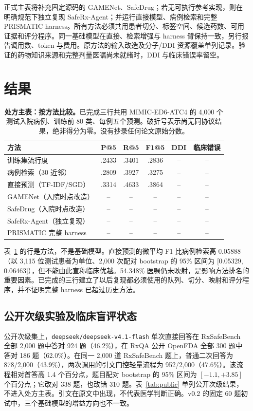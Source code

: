 \documentclass[UTF8,11pt,a4paper]{ctexart}
\begin{document}
正式主表将补充固定源码的 GAMENet、SafeDrug；若无可执行参考实现，则在明确规范下独立复现 SafeRx-Agent；并运行直接模型、病例检索和完整 PRISMATIC harness。所有方法必须共用患者切分、标签空间、候选药数、可用证据和评分程序。同一基础模型在直接、检索增强与 harness 臂保持一致，另行报告调用数、token 与费用。原方法的输入改造及分子/DDI 资源覆盖单列记录。验证的药物知识来源和完整剂量医嘱尚未就绪时，DDI 与临床错误率留空。

\section{结果}
\begin{table}[t]
\centering\small
\caption{\textbf{处方主表：按方法比较。}已完成三行共用 MIMIC-ED6-ATC4 的 4,000 个测试入院病例、训练前 80 类、每例五个预测。破折号表示尚无同协议结果，绝非得分为零。没有抄录任何论文原始分数。}
\label{tab:main}
\begin{tabular}{@{}p{4.1cm}ccccc@{}}
\toprule
方法 & P@5 & R@5 & F1@5 & DDI & 临床错误 \\
\midrule
训练集流行度 & .2433 & .3401 & .2836 & -- & -- \\
病例检索（30 近邻） & .2809 & .3927 & .3275 & -- & -- \\
直接预测（TF-IDF/SGD） & .3314 & .4633 & .3864 & -- & -- \\
GAMENet（入院时点改造） & -- & -- & -- & -- & -- \\
SafeDrug（入院时点改造） & -- & -- & -- & -- & -- \\
SafeRx-Agent（独立复现） & -- & -- & -- & -- & -- \\
PRISMATIC 完整 harness & -- & -- & -- & -- & -- \\
\bottomrule
\end{tabular}
\end{table}

表~\ref{tab:main} 的行是方法，不是基础模型。直接预测的微平均 F1 比病例检索高 0.05888（以 3,115 位测试患者为单位、2,000 次配对 bootstrap 的 95\% 区间为 [0.05329, 0.06463]），但不能由此宣称临床优越。54.348\% 医嘱仍未映射，是影响方法排名的重要因素。已完成的三行建立了以后复现都必须使用的队列、切分、映射和评分程序，并不证明完整 harness 已超过历史方法。

\subsection{公开次级实验及临床盲评状态}
公开次级集上，\texttt{deepseek/deepseek-v4.1-flash} 单次直接回答在 RxSafeBench 全部 2,000 题中答对 924 题（46.2\%），在 RxQA 公开 OpenFDA 全部 300 题中答对 186 题（62.0\%）。在同一 2,000 道 RxSafeBench 题上，普通二次回答为 878/2,000（43.9\%），两次调用的引文门控轻量流程为 952/2,000（47.6\%）。该流程相对首答高 1.4 个百分点，题目配对 bootstrap 的 95\% 区间为 $[-1.1,+3.85]$ 个百分点；它改对 338 题，也改错 310 题。表~\ref{tab:public} 单列公开次级结果，不进入处方主表。引文在原文中出现，不代表医学判断正确。v0.2 的固定 60 题初试中，三个基础模型的增益方向也不一致\cite{v02}。
\end{document}
